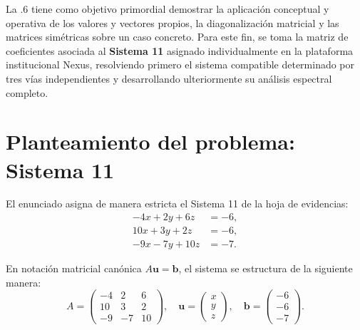 \documentclass[spanish,letterpaper,oneside]{article}
\begin{document}
La .6 tiene como objetivo primordial demostrar la aplicación conceptual y operativa de los valores y vectores propios, la diagonalización matricial y las matrices simétricas sobre un caso concreto. Para este fin, se toma la matriz de coeficientes asociada al \textbf{Sistema 11} asignado individualmente en la plataforma institucional Nexus, resolviendo primero el sistema compatible determinado por tres vías independientes y desarrollando ulteriormente su análisis espectral completo.

\section{Planteamiento del problema: Sistema 11}

El enunciado asigna de manera estricta el Sistema 11 de la hoja de evidencias:
\begin{equation}\label{eq:sistema11}
\begin{aligned}
-4x + 2y + 6z &= -6, \\
10x + 3y + 2z &= -6, \\
-9x - 7y + 10z &= -7.
\end{aligned}
\end{equation}

En notación matricial canónica $A\mathbf{u} = \mathbf{b}$, el sistema se estructura de la siguiente manera:
\begin{equation}
A = \begin{pmatrix} -4 & 2 & 6 \\ 10 & 3 & 2 \\ -9 & -7 & 10 \end{pmatrix}, \quad
\mathbf{u} = \begin{pmatrix} x \\ y \\ z \end{pmatrix}, \quad
\mathbf{b} = \begin{pmatrix} -6 \\ -6 \\ -7 \end{pmatrix}.
\end{equation}
\end{document}
